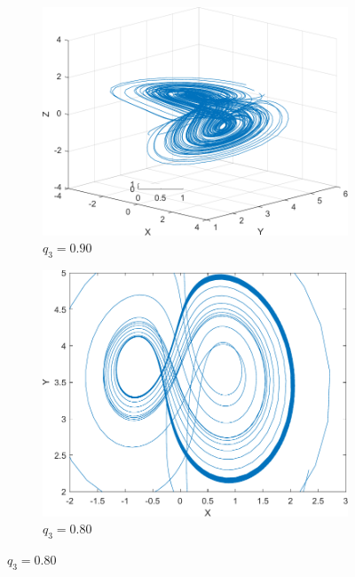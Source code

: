 \begin{figure}[H]
        \centering
        \begin{subfigure}[b]{0.475\textwidth}
            \centering
            \includegraphics[scale=0.5]{files/a_1_1_090.pdf}
            \caption{$q_3=0.90$}    
            \label{fig:mean and std of net14}
        \end{subfigure}
        \hfill
        \begin{subfigure}[b]{0.475\textwidth}  
            \centering 
            \includegraphics[scale=0.5]{files/b_1_1_080.pdf}
            \caption{$q_3=0.80$}  
            \label{fig:messed2}
        \end{subfigure}

\end{figure}
